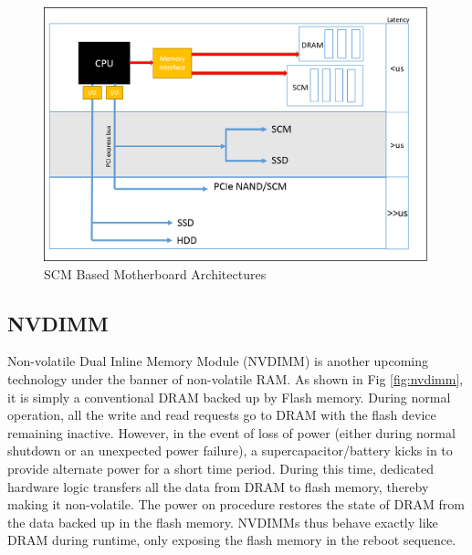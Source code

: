 \begin{figure}[H]
  \centering
  \includegraphics[scale=0.7]{figures/new_mem_arch.png}
  \caption[SCM Based Motherboard Architectures]{SCM Based Motherboard Architectures \cite{mother_archi}}
  \label{fig:new_arch}
\end{figure}

\subsection{NVDIMM}
Non-volatile Dual Inline Memory Module (NVDIMM) \cite{nvdimm} is another upcoming technology under the banner of non-volatile RAM. As shown in Fig \ref{fig:nvdimm}, it is simply a conventional DRAM backed up by Flash memory. During normal operation, all the write and read requests go to DRAM with the flash device remaining inactive. However, in the event of loss of power (either during normal shutdown or an unexpected power failure), a supercapacitor/battery kicks in to provide alternate power for a short time period. During this time, dedicated hardware logic transfers all the data from DRAM to flash memory, thereby making it non-volatile. The power on procedure restores the state of DRAM from the data backed up in the flash memory. NVDIMMs thus behave exactly like DRAM during runtime, only exposing the flash memory in the reboot sequence. 

\setlength{\belowcaptionskip}{-10pt}

